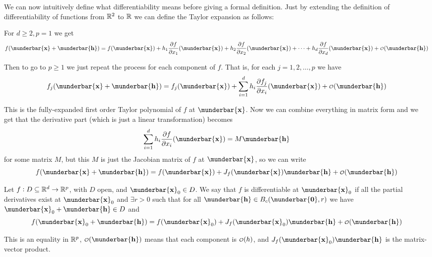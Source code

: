 \documentclass[14pt]{extarticle}
\renewcommand{\vec}[1]{\munderbar{\mathbf{#1}}}
\begin{document}
We can now intuitively define what differentiability means before giving a formal definition.
Just by extending the definition of differentiability of functions from $\mathbb{R}^2$ to $\mathbb{R}$ we can define the Taylor expansion as follows:

For $d \geq 2, p = 1$ we get
\begin{equation}
    f(\vec{x} + \vec{h}) = f(\vec{x}) + h_1 \pdv{f}{x_1}()(\vec{x}) + h_2 \pdv{f}{x_2}()(\vec{x}) + \cdots + h_d \pdv{f}{x_d}()(\vec{x}) + \o(\vec{h})
\end{equation}

Then to go to $p \geq 1$ we just repeat the process for each component of $f$.
That is, for each $j = 1, 2, \ldots, p$ we have
\begin{equation}
    f_j(\vec{x} + \vec{h}) = f_j(\vec{x}) + \sum_{i=1}^d h_i \pdv{f_j}{x_i}()(\vec{x}) + \o(\vec{h})
\end{equation}

This is the fully-expanded first order Taylor polynomial of $f$ at $\vec{x}$.
Now we can combine everything in matrix form and we get that the derivative part (which is just a linear transformation) becomes
\begin{equation}
    \sum_{i = 1}^d h_i \pdv{f}{x_i}()(\vec{x}) = M \vec{h}
\end{equation}
for some matrix $M$, but this $M$ is just the Jacobian matrix of $f$ at $\vec{x}$, so we can write
\begin{equation}
    f(\vec{x} + \vec{h}) = f(\vec{x}) + J_f(\vec{x}) \vec{h} + \o(\vec{h})
\end{equation}

\begin{definition}[differentiability]
    Let $f: D \subseteq \mathbb{R}^d \to \mathbb{R}^p$, with $D$ open, and $\vec{x}_0 \in D$.
    We say that $f$ is differentiable at $\vec{x}_0$ if all the partial derivatives exist at $\vec{x}_0$
    and $\exists r > 0$ such that for all $\vec{h} \in B_c(\vec{0}, r)$ we have $\vec{x}_0 + \vec{h} \in D$ and
    \begin{equation}
        f(\vec{x}_0 + \vec{h}) = f(\vec{x}_0) + J_f(\vec{x}_0) \vec{h} + \o(\vec{h})
    \end{equation}
\end{definition}

\begin{remark}
    This is an equality in $\mathbb{R}^p$, $\o(\vec{h})$ means that each component is $\o(h)$, and $J_f(\vec{x}_0) \vec{h}$ is the matrix-vector product.
\end{remark}
\end{document}
